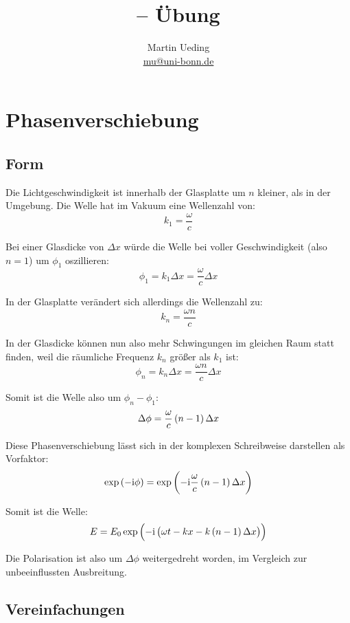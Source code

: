 \documentclass[11pt, ngerman, fleqn]{article}
\title{\themodul{} -- Übung \theuebung \\ \vspace{0.5cm} \large{\thegruppe}}
\author{Martin Ueding \\ \small{\href{mailto:mu@uni-bonn.de}{mu@uni-bonn.de}}}
\newcommand{\ii}{\mathrm i}
\begin{document}
\maketitle


\section{Phasenverschiebung}

\subsection{Form}

Die Lichtgeschwindigkeit ist innerhalb der Glasplatte um $n$ kleiner, als in
der Umgebung. Die Welle hat im Vakuum eine Wellenzahl von:
\[
	k_1 = \frac \omega c
\]

Bei einer Glasdicke von $\Delta x$ würde die Welle bei voller Geschwindigkeit
(also $n=1$) um $\phi_1$ oszillieren:
\[
	\phi_1 = k_1 \Delta x = \frac \omega c \Delta x
\]

In der Glasplatte verändert sich allerdings die Wellenzahl zu:
\[
	k_n = \frac{\omega n}{c}
\]

In der Glasdicke können nun also mehr Schwingungen im gleichen Raum statt
finden, weil die räumliche Frequenz $k_n$ größer als $k_1$ ist:
\[
	\phi_n = k_n \Delta x = \frac{\omega n}c \Delta x
\]

Somit ist die Welle also um $\phi_n - \phi_1$:
\[
	\Delta \phi = \frac\omega c \del{n - 1} \Delta x
\]

Diese Phasenverschiebung lässt sich in der komplexen Schreibweise darstellen
als Vorfaktor:
\[
	\exp\del{-\ii \phi} = \exp\del{- \ii \frac\omega c \del{n - 1} \Delta x}
\]

Somit ist die Welle:
\[
	E = E_0 \exp\del{-\ii \del{\omega t - kx - k \del{n - 1} \Delta x}}
\]

Die Polarisation ist also um $\Delta \phi$ weitergedreht worden, im Vergleich
zur unbeeinflussten Ausbreitung.

\subsection{Vereinfachungen}
\end{document}
